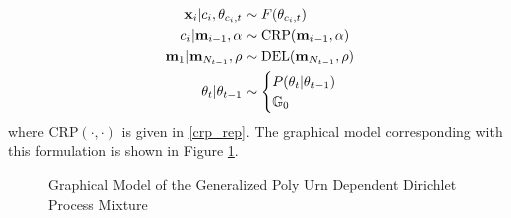 \documentclass[smallcondensed, final]{svjour3}
\begin{document}
\begin{align}
\begin{split}
	\bold{x}_{i} | c_{i}, \theta_{c_{i}, t} &\sim F(\theta_{c_{i}, t}) \\
	c_{i} | \bold{m}_{i-1}, \alpha  &\sim  \text{CRP}(\bold{m}_{i-1}, \alpha) \\
	\bold{m}_{1} | \bold{m}_{N_{t-1}}, \rho  &\sim \text{DEL}(\bold{m}_{N_{t-1}}, \rho) \\
	\theta_{t} | \theta_{t-1}   &\sim 
\begin{cases}
	P(\theta_{t} | \theta_{t-1}) \\
	\mathbb{G}_{0}
\end{cases}
\end{split}
\end{align}
where $\text{CRP}(\cdot, \cdot)$ is given in \eqref{crp_rep}. The graphical model corresponding with this formulation is shown in Figure \ref{fig:gpuddpm_gm_1}.

\begin{figure}[h]
        \caption{\label{fig:gpuddpm_gm_1} Graphical Model of the Generalized Poly Urn Dependent Dirichlet Process Mixture}
\end{figure}
\end{document}
